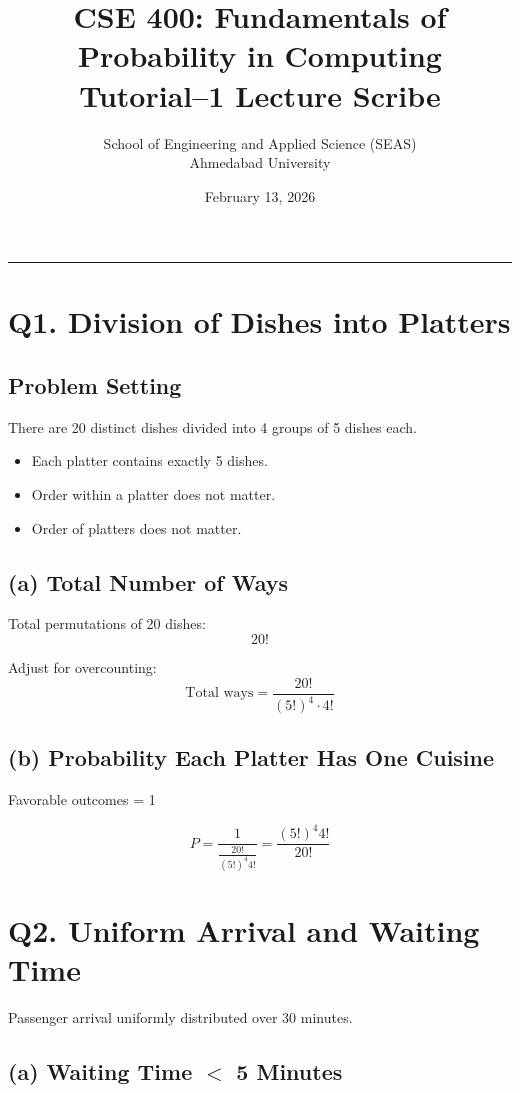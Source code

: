 \documentclass[12pt]{article}
\title{\textbf{CSE 400: Fundamentals of Probability in Computing}\\
Tutorial--1 Lecture Scribe}
\author{School of Engineering and Applied Science (SEAS)\\
Ahmedabad University}
\date{February 13, 2026}
\begin{document}
\maketitle
\hrule
\vspace{0.5cm}

\section*{Q1. Division of Dishes into Platters}

\subsection*{Problem Setting}

There are 20 distinct dishes divided into 4 groups of 5 dishes each.
\begin{itemize}
    \item Each platter contains exactly 5 dishes.
    \item Order within a platter does not matter.
    \item Order of platters does not matter.
\end{itemize}

\subsection*{(a) Total Number of Ways}

Total permutations of 20 dishes:
\[
20!
\]

Adjust for overcounting:
\[
\text{Total ways} = \frac{20!}{(5!)^4 \cdot 4!}
\]

\subsection*{(b) Probability Each Platter Has One Cuisine}

Favorable outcomes = 1

\[
P = \frac{1}{\frac{20!}{(5!)^4 4!}}
= \frac{(5!)^4 4!}{20!}
\]

\section*{Q2. Uniform Arrival and Waiting Time}

Passenger arrival uniformly distributed over 30 minutes.

\subsection*{(a) Waiting Time $<$ 5 Minutes}
\end{document}
